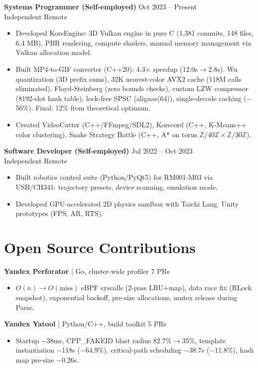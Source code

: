 \documentclass[10pt, a4paper]{article}
\newcommand{\entry}[4]{{\textbf{#1}} \hfill {\small\color{graytext}#2}\\{\small #3 \hfill #4}\vspace{2pt}}
\newcommand{\projentry}[3]{{\textbf{#1}} {\small\color{graytext}| #2} \hfill {\small #3}\\}
\begin{document}
\entry{Systems Programmer (Self-employed)}{Oct 2023 -- Present}{Independent}{Remote}
\begin{itemize}
\item Developed KorsEngine: 3D Vulkan engine in pure C (1,381 commits, 148 files, 6.4 MB). PBR rendering, compute shaders, manual memory management via Vulkan allocation model.
\item Built MP4-to-GIF converter (C++20): 4.3$\times$ speedup (12.0s$\to$2.8s). Wu quantization (3D prefix sums), 32K nearest-color AVX2 cache (118M calls eliminated), Floyd-Steinberg (zero bounds checks), custom LZW compressor (8192-slot hash table), lock-free SPSC (alignas(64)), single-decode caching ($-$56\%). Final: 12\% from theoretical optimum.
\item Created VideoCutter (C++/FFmpeg/SDL2), Korscord (C++, K-Means++ color clustering), Snake Strategy Battle (C++, A* on torus $\mathbb{Z}/40\mathbb{Z} \times \mathbb{Z}/30\mathbb{Z}$).
\end{itemize}

\entry{Software Developer (Self-employed)}{Jul 2022 -- Oct 2023}{Independent}{Remote}
\begin{itemize}
\item Built robotics control suite (Python/PyQt5) for RM001-M03 via USB/CH341: trajectory presets, device scanning, emulation mode.
\item Developed GPU-accelerated 2D physics sandbox with Taichi Lang. Unity prototypes (FPS, AR, RTS).
\end{itemize}

\vspace{-2pt}

\section{Open Source Contributions}

\projentry{Yandex Perforator}{Go, cluster-wide profiler}{7 PRs}
\begin{itemize}
\item $O(n){\to}O(\text{miss})$ eBPF syscalls (2-pass LRU+map), data race fix (RLock snapshot), exponential backoff, pre-size allocations, mutex release during Parse.
\end{itemize}

\projentry{Yandex Yatool}{Python/C++, build toolkit}{5 PRs}
\begin{itemize}
\item Startup $-$38ms, CPP\_FAKEID blast radius 82.7\%$\to$35\%, template instantiation $-$118s ($-$64.9\%), critical-path scheduling $-$38.7s ($-$11.8\%), hash map pre-size $-$0.26s.
\end{itemize}
\end{document}
